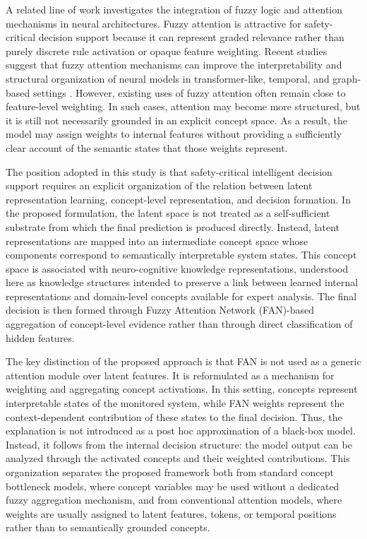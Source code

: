 \documentclass[runningheads]{llncs}
\begin{document}
A related line of work investigates the integration of fuzzy logic and attention mechanisms in neural architectures. Fuzzy attention is attractive for safety-critical decision support because it can represent graded relevance rather than purely discrete rule activation or opaque feature weighting. Recent studies suggest that fuzzy attention mechanisms can improve the interpretability and structural organization of neural models in transformer-like, temporal, and graph-based settings \cite{chakraborty2025fantf,zhang2025hfan,zhao2026fanl,trofimov2025fuzzytransformer}. However, existing uses of fuzzy attention often remain close to feature-level weighting. In such cases, attention may become more structured, but it is still not necessarily grounded in an explicit concept space. As a result, the model may assign weights to internal features without providing a sufficiently clear account of the semantic states that those weights represent.

The position adopted in this study is that safety-critical intelligent decision support requires an explicit organization of the relation between latent representation learning, concept-level representation, and decision formation. In the proposed formulation, the latent space is not treated as a self-sufficient substrate from which the final prediction is produced directly. Instead, latent representations are mapped into an intermediate concept space whose components correspond to semantically interpretable system states. This concept space is associated with neuro-cognitive knowledge representations, understood here as knowledge structures intended to preserve a link between learned internal representations and domain-level concepts available for expert analysis. The final decision is then formed through Fuzzy Attention Network (FAN)-based aggregation of concept-level evidence rather than through direct classification of hidden features.

The key distinction of the proposed approach is that FAN is not used as a generic attention module over latent features. It is reformulated as a mechanism for weighting and aggregating concept activations. In this setting, concepts represent interpretable states of the monitored system, while FAN weights represent the context-dependent contribution of these states to the final decision. Thus, the explanation is not introduced as a post hoc approximation of a black-box model. Instead, it follows from the internal decision structure: the model output can be analyzed through the activated concepts and their weighted contributions. This organization separates the proposed framework both from standard concept bottleneck models, where concept variables may be used without a dedicated fuzzy aggregation mechanism, and from conventional attention models, where weights are usually assigned to latent features, tokens, or temporal positions rather than to semantically grounded concepts.
\end{document}
